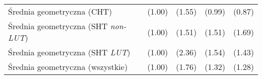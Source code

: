\begin{table}[p]
\begin{tabularx}{\linewidth}{c l X r r r r}


        \multicolumn{3}{l}{Średnia geometryczna (CHT)}&(1.00)&(1.55)&(0.99)&(0.87) \\
        \multicolumn{3}{l}{Średnia geometryczna (SHT \textit{non-LUT})}&(1.00)&(1.51)&(1.51)&(1.69)\\
        \multicolumn{3}{l}{Średnia geometryczna (SHT \textit{LUT})}&(1.00)&(2.36)&(1.54)&(1.43)\\
        \multicolumn{3}{l}{Średnia geometryczna (wszystkie)}&(1.00)&(1.76)&(1.32)&(1.28)\\\hline
    \end{tabularx}

\end{table}
